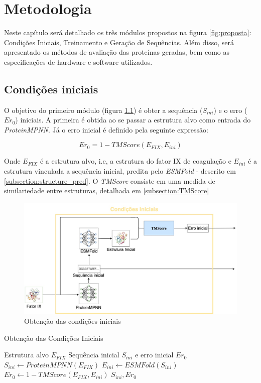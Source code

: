 \chapter{Metodologia}
Neste capítulo será detalhado os três módulos propostos na figura \ref{fig:proposta}: 
Condições Iniciais, Treinamento e Geração de Sequências. 
Além disso, será apresentado os métodos de avaliação das proteínas geradas,
bem como as especificações de hardware e software utilizados. 


\section{Condições iniciais}
O objetivo do primeiro módulo (figura \ref{fig:cond_iniciais}) é obter a sequência ($S_{ini}$) e o erro ($Er_{0}$) iniciais. 
A primeira é obtida ao se passar a estrutura alvo como entrada do \textit{ProteinMPNN}.
Já o erro inicial é definido pela seguinte expressão:
 
\begin{equation}
    Er_{0} = 1 - TMScore(E_{FIX}, E_{ini})
\end{equation}

\noindent
Onde $E_{FIX}$ é a estrutura alvo, i.e, a estrutura do fator IX de coagulação e $E_{ini}$ é a estrutura vinculada a sequência inicial, 
predita pelo \textit{ESMFold} - descrito em \ref{subsection:structure_pred}. 
O \textit{TMScore} consiste em uma medida de similariedade entre estruturas, detalhada em \ref{subsection:TMScore}

\begin{figure}[H]
  \centering
  \includegraphics[width=.8\textwidth]{figuras/metodologia-Initial_cond.jpg}
  \caption{Obtenção das condições iniciais}
  \label{fig:cond_iniciais}
\end{figure}

\begin{algorithm}
  \caption{Obtenção das Condições Iniciais}
  \label{alg:initial_conditions}
  \begin{algorithmic}[1]
  \Require Estrutura alvo $E_{FIX}$
  \Ensure Sequência inicial $S_{ini}$ e erro inicial $Er_{0}$
  \State $S_{ini} \gets \textit{ProteinMPNN}(E_{FIX})$
  \State $E_{ini} \gets \textit{ESMFold}(S_{ini})$
  \State $Er_{0} \gets 1 - \textit{TMScore}(E_{FIX}, E_{ini})$
  \State \Return $S_{ini}, Er_{0}$
  \end{algorithmic}
  \end{algorithm}

